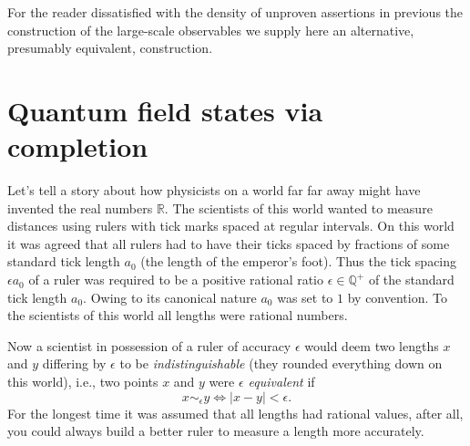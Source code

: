 \documentclass[11pt]{amsart}
\theoremstyle{plain}%
\theoremstyle{definition}
\theoremstyle{remark}
\begin{document}
For the reader dissatisfied with the density of unproven assertions in previous the construction of the large-scale observables we supply here an alternative, presumably equivalent, construction.

\section{Quantum field states via completion}\label{sec:qftcompletion}
Let's tell a story about how physicists on a world far far away might have invented the real numbers $\mathbb{R}$.  The scientists of this world wanted to measure distances using rulers with tick marks spaced at regular intervals. On this world it was agreed that all rulers had to have their ticks spaced by fractions of some standard tick length $a_0$ (the length of the emperor's foot). Thus the tick spacing $\epsilon a_0$ of a ruler was required to be a positive rational ratio $\epsilon \in \mathbb{Q}^+$ of the standard tick length $a_0$. Owing to its canonical nature $a_0$ was set to $1$ by convention. To the scientists of this world all lengths were rational numbers. 

Now a scientist in possession of a ruler of accuracy $\epsilon$ would deem two lengths $x$ and $y$ differing by $\epsilon$ to be \emph{indistinguishable} (they rounded everything down on this world), i.e., two points $x$ and $y$ were \emph{$\epsilon$ equivalent} if
\begin{equation}
	x\sim_\epsilon y \Leftrightarrow |x-y| < \epsilon. 
\end{equation} 
For the longest time it was assumed that all lengths had rational values, after all, you could always build a better ruler to measure a length more accurately. 
\end{document}
